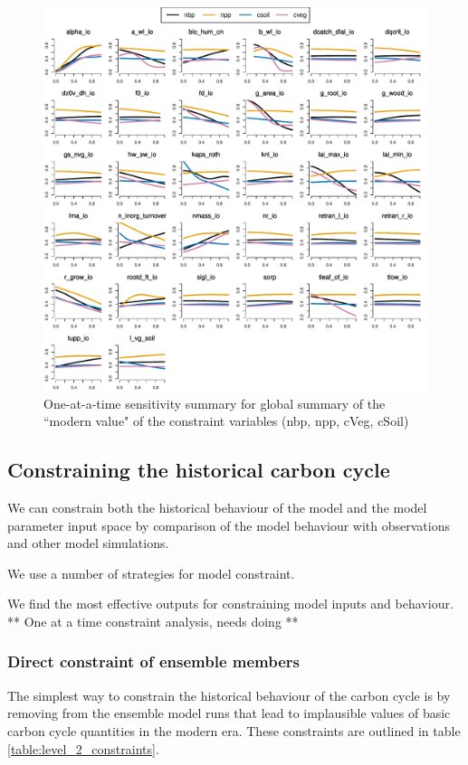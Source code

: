 \documentclass[gmd, manuscript]{copernicus}
\begin{document}
\begin{figure}[t]
\includegraphics[width=12cm]{./graphics/Y_oaat_const_level1a_scaled_norm}
\caption{One-at-a-time sensitivity summary for global summary of the ``modern value" of the constraint variables (nbp, npp, cVeg, cSoil)}
\label{fig:Y_oaat_const_level1a_scaled_norm}
\end{figure}



\subsection{Constraining the historical carbon cycle}

We can constrain both the historical behaviour of the model and the model parameter input space by comparison of the model behaviour with observations and other model simulations.

We use a number of strategies for model constraint.

We find the most effective outputs for constraining model inputs and behaviour. ** One at a time constraint analysis, needs doing **


\subsubsection{Direct constraint of ensemble members}

The simplest way to constrain the historical behaviour of the carbon cycle is by removing from the ensemble model runs that lead to implausible values of basic carbon cycle quantities in the modern era. These constraints are outlined in table \ref{table:level_2_constraints}.
\end{document}
